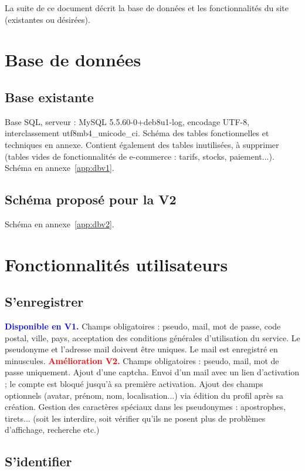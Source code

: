 \documentclass[a4paper,10pt]{article}
\newcommand\existant[1]{\noindent\textbf{\textcolor{blue}{#1}}}
\newcommand\desire[1]{\noindent\textbf{\textcolor{red}{#1}}}
\begin{document}
La suite de ce document décrit la base de données et les fonctionnalités du site (existantes ou désirées).


\section{Base de données}
\subsection{Base existante}
Base SQL, serveur : MySQL 5.5.60-0+deb8u1-log, encodage UTF-8, interclassement utf8mb4\_unicode\_ci. Schéma des tables fonctionnelles et techniques en annexe. Contient également des tables inutilisées, à supprimer (tables vides de fonctionnalités de e-commerce : tarifs, stocks, paiement...). Schéma en annexe~\ref{app:dbv1}.

\subsection{Schéma proposé pour la V2}

Schéma en annexe~\ref{app:dbv2}.

\section{Fonctionnalités utilisateurs}
\subsection{S'enregistrer}

\existant{Disponible en V1.} Champs obligatoires : pseudo, mail, mot de passe, code postal, ville, pays, acceptation des conditions générales d'utilisation du service. Le pseudonyme et l'adresse mail doivent être uniques. Le mail est enregistré en minuscules. 
\desire{Amélioration V2.} Champs obligatoires : pseudo, mail, mot de passe uniquement. Ajout d'une captcha. Envoi d'un mail avec un lien d'activation ; le compte est bloqué jusqu'à sa première activation. Ajout des champs optionnels (avatar, prénom, nom, localisation...) via édition du profil après sa création. Gestion des caractères spéciaux dans les pseudonymes : apostrophes, tirets... (soit les interdire, soit vérifier qu'ils ne posent plus de problèmes d'affichage, recherche etc.) 

\subsection{S'identifier}
\end{document}

